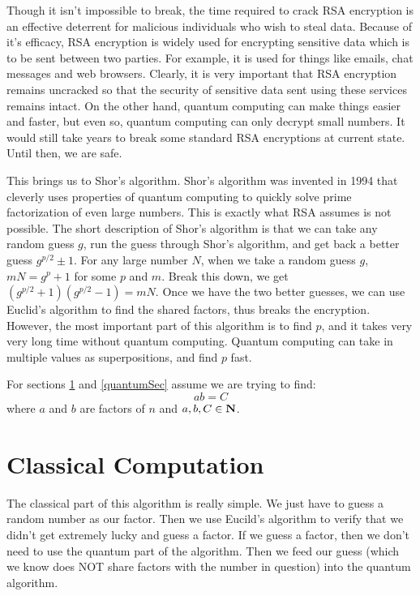 \documentclass[a4paper]{article}
\begin{document}
Though it isn't impossible to break, the time required to crack RSA encryption is an effective deterrent for malicious individuals who wish to steal data. Because of it's efficacy, RSA encryption is widely used for encrypting sensitive data which is to be sent between two parties. For example, it is used for things like emails, chat messages and web browsers. Clearly, it is very important that RSA encryption remains uncracked so that the security of sensitive data sent using these services remains intact. On the other hand, quantum computing can make things easier and faster, but even so, quantum computing can only decrypt small numbers. It would still take years to break some standard RSA encryptions at current state. Until then, we are safe.

This brings us to Shor's algorithm. Shor's algorithm was invented in 1994 that cleverly uses properties of quantum computing to quickly solve prime factorization of even large numbers. This is exactly what RSA assumes is not possible. The short description of Shor's algorithm is that we can take any random guess $g$, run the guess through Shor's algorithm, and get back a better guess $g^{p/2} \pm 1$. For any large number $N$, when we take a random guess $g$, $mN = g^p +1$ for some $p$ and $m$. Break this down, we get $(g^{p/2}+1)(g^{p/2}-1) = mN$. Once we have the two better guesses, we can use Euclid's algorithm to find the shared factors, thus breaks the encryption. However, the most important part of this algorithm is to find $p$, and it takes very very long time without quantum computing. Quantum computing can take in multiple values as superpositions, and find $p$ fast.

For sections \ref{classicalSec} and \ref{quantumSec} assume we are trying to find: 
$$ab = C$$
where $a$ and $b$ are factors of $n$ and $a,b,C \in \mathbf{N}$.

\section{Classical Computation}
\label{classicalSec}
The classical part of this algorithm is really simple. We just have to guess a random number as our factor. Then we use Eucild's algorithm to verify that we didn't get extremely lucky and guess a factor. If we guess a factor, then we don't need to use the quantum part of the algorithm. Then we feed our guess (which we know does NOT share factors with the number in question) into the quantum algorithm. 
\end{document}
